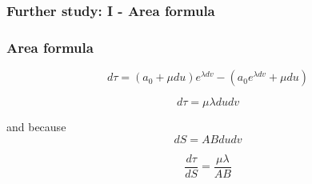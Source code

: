 \documentclass[aspectratio=169]{beamer}
\begin{document}
\begin{frame}
    \frametitle{Further study: I - Area formula}
    \begin{figure}[ht]\centering
    \end{figure}
\end{frame}

\begin{frame}
    \frametitle{Area formula}
    \[
        d\tau = (a_0 + \mu du) e^{\lambda dv} - (a_0 e^{\lambda dv} + \mu du)
    \]

    \[
        d\tau = \mu \lambda du dv
    \]

    and because
    \[
        dS = AB du dv
    \]

    \begin{equation}
        \frac{d\tau}{dS} = \frac{\mu \lambda}{AB}
    \end{equation}
\end{frame}
\end{document}
